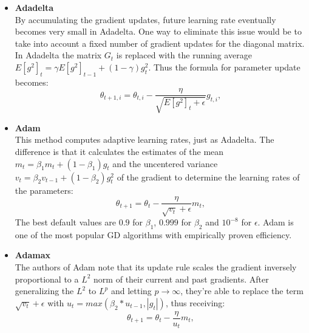 \begin{itemize}
  \item \textbf{Adadelta} \autocite{zeiler2012adadeltaadaptivelearningrate} \\
    By accumulating the gradient updates, future learning rate eventually becomes very small in Adadelta. One way to eliminate this issue would be to take into account a fixed number of gradient updates for the diagonal matrix. In Adadelta the matrix $ G_t $ is replaced with the running average $E[g^2]_t = \gamma E[g^2]_{t-1} + (1 - \gamma)g_t^2$. Thus the formula for parameter update becomes:
    \[ \theta_{t+1, i} = \theta_{t, i} - \frac{\eta}{\sqrt{E[g^2]_t + \epsilon}} g_{t,i}, \]
  \item \textbf{Adam} \autocite{kingma2015adam} \\
    This method computes adaptive learning rates, just as Adadelta. The difference is that it calculates the estimates of the mean $ m_t = \beta_1 m_t + (1 - \beta_1)g_t $ and the uncentered variance $ v_t = \beta_2 v_{t-1} + (1 - \beta_2)g_t^2 $ of the gradient to determine the learning rates of the parameters:
    \[ \theta_{t+1} = \theta_t - \frac{\eta}{\sqrt{v_t} + \epsilon} m_t, \]
    The best default values are $0.9$ for $\beta_1$, $0.999$ for $\beta_2$ and $10^{-8}$ for $\epsilon$. Adam is one of the most popular GD algorithms with empirically proven efficiency.
  \item \textbf{Adamax} \autocite{kingma2015adam} \\
    The authors of Adam note that its update rule scales the gradient inversely proportional to a $L^2$ norm of their current and past gradients. After generalizing the $L^2$ to $L^p$ and letting $p \rightarrow \infty$, they're able to replace the term $\sqrt{v_t} + \epsilon$ with $u_t = max(\beta_2 * u_{t - 1}, |g_t|)$, thus receiving:
    \[ \theta_{t+1} = \theta_t - \frac{\eta}{u_t} m_t, \]
\end{itemize}
